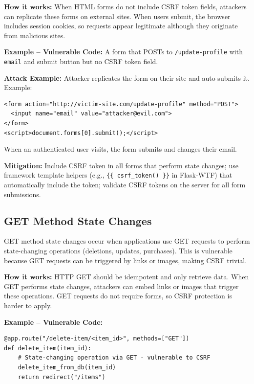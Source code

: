 \textbf{How it works:} When HTML forms do not include CSRF token fields, attackers can replicate these forms on external sites. When users submit, the browser includes session cookies, so requests appear legitimate although they originate from malicious sites.

\textbf{Example -- Vulnerable Code:} A form that POSTs to \texttt{/update-profile} with \texttt{email} and submit button but no CSRF token field.

\textbf{Attack Example:} Attacker replicates the form on their site and auto-submits it. Example:
\begin{lstlisting}[style=attackcode]
<form action="http://victim-site.com/update-profile" method="POST">
  <input name="email" value="attacker@evil.com">
</form>
<script>document.forms[0].submit();</script>
\end{lstlisting}
When an authenticated user visits, the form submits and changes their email.

\textbf{Mitigation:} Include CSRF token in all forms that perform state changes; use framework template helpers (e.g., \texttt{\{\{ csrf\_token() \}\}} in Flask-WTF) that automatically include the token; validate CSRF tokens on the server for all form submissions.

\subsection{GET Method State Changes}
\label{sec:csrf_get_state}

GET method state changes occur when applications use GET requests to perform state-changing operations (deletions, updates, purchases). This is vulnerable because GET requests can be triggered by links or images, making CSRF trivial.

\textbf{How it works:} HTTP GET should be idempotent and only retrieve data. When GET performs state changes, attackers can embed links or images that trigger these operations. GET requests do not require forms, so CSRF protection is harder to apply.

\textbf{Example -- Vulnerable Code:}

\begin{lstlisting}[style=pycode]
@app.route("/delete-item/<item_id>", methods=["GET"])
def delete_item(item_id):
    # State-changing operation via GET - vulnerable to CSRF
    delete_item_from_db(item_id)
    return redirect("/items")
\end{lstlisting}

